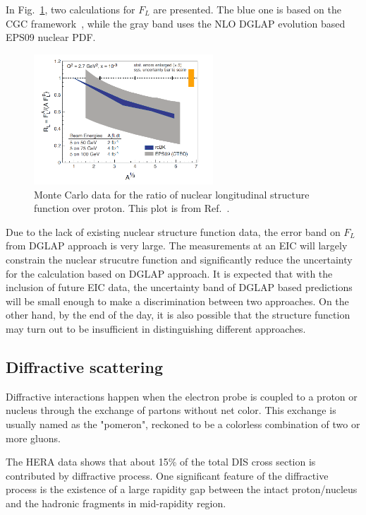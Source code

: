In Fig.~\ref{fig:F_L},
two calculations for $F_L$ are presented. The blue one is based on the CGC framework~\cite{Albacete:2009fh},
while the gray band uses the NLO DGLAP evolution based EPS09 nuclear PDF. 
\begin{figure}
\centering
\includegraphics[width=0.6\textwidth]{plots/chpt3/FL_WP.png}
\caption[Longitudinal structure function ratio]{
Monte Carlo data for the ratio of nuclear longitudinal structure function over proton. This plot is from Ref.~\cite{Accardi:2012qut}.}
\label{fig:F_L}
\end{figure}
Due to the lack of existing nuclear structure function data, the error band on $F_L$ from 
DGLAP approach is very large. The measurements at an EIC will largely constrain the nuclear strucutre
function and significantly reduce the uncertainty for the calculation based on DGLAP approach.
It is expected that with the inclusion of future EIC data, the uncertainty band of DGLAP based
predictions will be small enough to make a discrimination between two approaches.
On the other hand, by the end of the day, it is also possible that the structure function may turn out to be insufficient 
in distinguishing different approaches.




\subsection{Diffractive scattering}
Diffractive interactions happen when the electron probe is coupled to a proton
or nucleus through the exchange of partons without net color. This exchange is
usually named as the "pomeron", reckoned to be a colorless combination of two or
more gluons.

The HERA data shows that about 15\% of the total DIS cross section is
contributed by diffractive process. One significant feature of the diffractive
process is the existence of a large rapidity gap between the intact
proton/nucleus and the hadronic fragments in mid-rapidity region.

